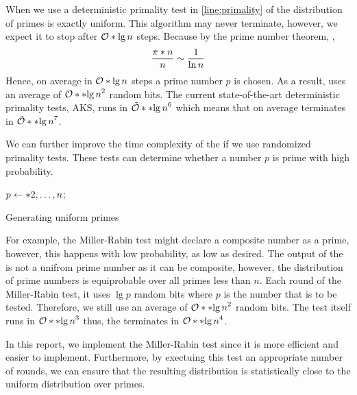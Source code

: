 When we use a deterministic primality test in \cref{line:primality} of  the distribution of primes is exactly uniform. This algorithm may never terminate, however, we expect it to stop after \(\bigO{\lg n}\) steps. Because by the prime number theorem, , 
\begin{equation}
    \dfrac{\func{\pi}{n}}{n} \sim \dfrac{1}{\ln n}
\end{equation}
Hence, on average in \(\bigO{\lg n}\) steps a prime number \(p\) is chosen. As a result,  uses an average of \(\bigO{\bracket{\lg n}^2}\) random bits. The current state-of-the-art deterministic primality tests, AKS, runs in \(\logBigO{\bracket{\lg n}^6}\) \cite{lenstra} which means that on average  terminates in \(\logBigO{\bracket{\lg n}^7}\). 

We can further improve the time complexity of the  if we use randomized primality tests. These tests can determine whether a number \(p\) is prime with high probability. 
\begin{algorithm}
	\DontPrintSemicolon
    {
        \(p \gets \set{2,\dots, n}\);
    }
	\caption{Generating uniform primes}
    \label{alg:trivialRPNG}
\end{algorithm}

For example, the Miller-Rabin test might declare a composite number as a prime, however, this happens with low probability, as low as desired. The output of the  is not a unifrom prime number as it can be composite, however, the distribution of prime numbers is equiprobable over all primes less than \(n\). Each round of the Miller-Rabin test, it uses \(\lg p\) random bits where \(p\) is the number that is to be tested. Therefore, we still use an average of \(\bigO{\bracket{\lg n}^2}\) random bits. The test itself runs in \(\bigO{\bracket{\lg n}^3}\) \cite{bach} thus, the  terminates in \(\bigO{\bracket{\lg n}^4}\).

In this report, we implement the Miller-Rabin test since it is more efficient and easier to implement. Furthermore, by exectuing this test an appropriate number of rounds, we can ensure that the resulting distribution is statistically close to the uniform distribution over primes.

